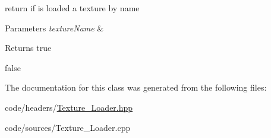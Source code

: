 return if is loaded a texture by name 


\begin{DoxyParams}{Parameters}
{\em texture\+Name} & \\
\hline
\end{DoxyParams}
\begin{DoxyReturn}{Returns}
true 

false 
\end{DoxyReturn}


The documentation for this class was generated from the following files\+:\begin{DoxyCompactItemize}
\item 
code/headers/\mbox{\hyperlink{_texture___loader_8hpp}{Texture\+\_\+\+Loader.\+hpp}}\item 
code/sources/Texture\+\_\+\+Loader.\+cpp\end{DoxyCompactItemize}
